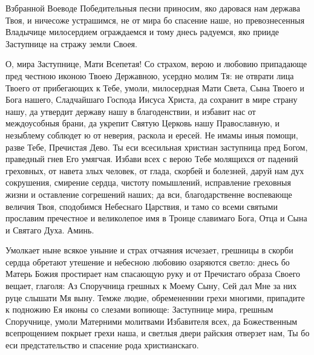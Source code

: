 


Взбранной Воеводе Победительныя песни приносим, яко даровася нам держава Твоя, и ничесоже устрашимся, не от мира бо спасение наше, но превознесенныя Владычице милосердием ограждаемся и тому днесь радуемся, яко прииде Заступнице на стражу земли Своея.




О, мира Заступнице, Мати Всепетая! Со страхом, верою и любовию припадающе пред честною иконою Твоею Державною, усердно молим Тя: не отврати лица Твоего от прибегающих к Тебе, умоли, милосердная Мати Света, Сына Твоего и Бога нашего, Сладчайшаго Господа Иисуса Христа, да сохранит в мире страну нашу, да утвердит державу нашу в благоденствии, и избавит нас от междоусобныя брани, да укрепит Святую Церковь нашу Православную, и незыблему соблюдет ю от неверия, раскола и ересей. Не имамы иныя помощи, разве Тебе, Пречистая Дево. Ты еси всесильная христиан заступница пред Богом, праведный гнев Его умягчая. Избави всех с верою Тебе молящихся от падений греховных, от навета злых человек, от глада, скорбей и болезней, даруй нам дух сокрушения, смирение сердца, чистоту помышлений, исправление греховныя жизни и оставление согрешений наших; да вси, благодарственне воспевающе величия Твоя, сподобимся Небеснаго Царствия, и тамо со всеми святыми прославим пречестное и великолепое имя в Троице славимаго Бога, Отца и Сына и Святаго Духа. Аминь.
\longpage[2]{}\mychapterending

 



Умолкает ныне всякое уныние и страх отчаяния исчезает, грешницы в скорби сердца обретают утешение и небесною любовию озаряются светло: днесь бо Матерь Божия простирает нам спасающую руку и от Пречистаго образа Своего вещает, глаголя: Аз Споручница грешных к Моему Сыну, Сей дал Мне за них руце слышати Мя выну. Темже людие, обремененнии грехи многими, припадите к подножию Ея иконы со слезами вопиюще: Заступнице мира, грешным Споручнице, умоли Матерними молитвами Избавителя всех, да Божественным всепрощением покрыет грехи наша, и светлыя двери райския отверзет нам, Ты бо еси предстательство и спасение рода христианскаго.




